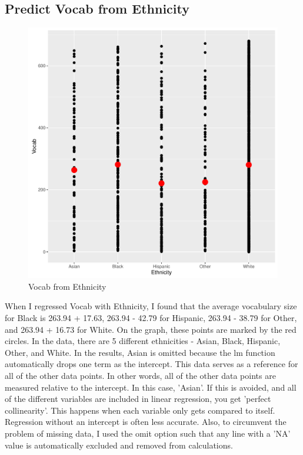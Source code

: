 \documentclass{article}
\begin{document}
    \subsection*{Predict Vocab from Ethnicity}
      \begin{figure}[H]
        \includegraphics[width=\linewidth]{vocab_from_ethnicity.pdf}
        \caption{Vocab from Ethnicity}
        \label{fig:regression2}
      \end{figure}
      When I regressed Vocab with Ethnicity, I found that the average
      vocabulary size for Black is 263.94 + 17.63, 263.94 - 42.79 for Hispanic,
      263.94 - 38.79 for Other, and 263.94 + 16.73 for White. On the graph,
      these points are marked by the red circles. \newline
      In the data, there are 5 different ethnicities - Asian, Black, Hispanic, Other, 
      and White. In the results, Asian is omitted because the lm function automatically
      drops one term as the intercept. This data serves as a reference for all of the
      other data points. In other words, all of the other data points are measured
      relative to the intercept. In this case, 'Asian'. If this is avoided, and all
      of the different variables are included in linear regression, you get
      'perfect collinearity'. This happens when each variable only gets compared to itself.
      Regression without an intercept is often less accurate. 
      Also, to circumvent the problem of missing data, I used the omit option
      such that any line with a 'NA' value is automatically excluded and removed
      from calculations. 
      
\end{document}
